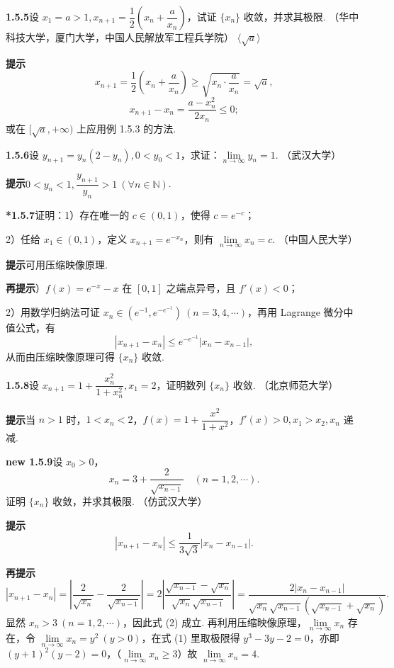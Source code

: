 \documentclass[UTF8, 12pt, fontset=fandol, oneside]{ctexart}
\begin{document}
\noindent\textbf{1.5.5}\quad 设 $x_1=a>1,x_{n+1}=\dfrac12\left(x_n+\dfrac a{x_n}\right)$，试证 $\{x_n\}$ 收敛，并求其极限. （华中科技大学，厦门大学，中国人民解放军工程兵学院） \hfill $\langle\sqrt a\rangle$

\noindent\textbf{提示}\quad
\[
  x_{n+1}=\frac12\left(x_n+\frac a{x_n}\right)\ge \sqrt{x_n\cdot \frac a{x_n}}=\sqrt a,
\]
\[
  x_{n+1}-x_n=\frac{a-x_n^2}{2x_n}\le 0;
\]
或在 $[\sqrt a,+\infty)$ 上应用例 1.5.3 的方法.

\noindent\textbf{1.5.6}\quad 设 $y_{n+1}=y_n(2-y_n),0<y_0<1$，求证：$\lim\limits_{n\to\infty}y_n=1$. （武汉大学）

\noindent\textbf{提示}\quad $0<y_n<1,\dfrac{y_{n+1}}{y_n}>1\ (\forall n\in\mathbb{N})$.

\noindent\textbf{*1.5.7}\quad 证明：1）存在唯一的 $c\in (0,1)$，使得 $c=e^{-c}$；

2）任给 $x_1\in (0,1)$，定义 $x_{n+1}=e^{-x_n}$，则有 $\lim\limits_{n\to\infty}x_n=c$. （中国人民大学）

\noindent\textbf{提示}\quad 可用压缩映像原理.

\noindent\textbf{再提示}）$f(x)=e^{-x}-x$ 在 $[0,1]$ 之端点异号，且 $f'(x)<0$；

2）用数学归纳法可证 $x_n\in (e^{-1},e^{-e^{-1}})\ (n=3,4,\cdots)$，再用 Lagrange 微分中值公式，有
\[
  |x_{n+1}-x_n|\le e^{-e^{-1}}|x_n-x_{n-1}|,
\]
从而由压缩映像原理可得 $\{x_n\}$ 收敛.

\noindent\textbf{1.5.8}\quad 设 $x_{n+1}=1+\dfrac{x_n^2}{1+x_n^2},x_1=2$，证明数列 $\{x_n\}$ 收敛. （北京师范大学）

\noindent\textbf{提示}\quad 当 $n>1$ 时，$1<x_n<2$，$f(x)=1+\dfrac{x^2}{1+x^2}$，$f'(x)>0,x_1>x_2,x_n$ 递减.

\noindent\textbf{new 1.5.9}\quad 设 $x_0>0$，
\[
  x_n=3+\frac{2}{\sqrt{x_{n-1}}}\quad (n=1,2,\cdots).
\tag{1}
\]
证明 $\{x_n\}$ 收敛，并求其极限. （仿武汉大学）

\noindent\textbf{提示}\quad
\[
  |x_{n+1}-x_n|\le \frac1{3\sqrt3}|x_n-x_{n-1}|.
\tag{2}
\]

\noindent\textbf{再提示}\quad
\[
  |x_{n+1}-x_n|
  =\left|\frac2{\sqrt{x_n}}-\frac2{\sqrt{x_{n-1}}}\right|
  =2\left|\frac{\sqrt{x_{n-1}}-\sqrt{x_n}}{\sqrt{x_n}\sqrt{x_{n-1}}}\right|
  =\frac{2|x_n-x_{n-1}|}{\sqrt{x_n}\sqrt{x_{n-1}}(\sqrt{x_{n-1}}+\sqrt{x_n})}.
\]
显然 $x_n>3\ (n=1,2,\cdots)$，因此式 (2) 成立. 再利用压缩映像原理，$\lim\limits_{n\to\infty}x_n$ 存在，令 $\lim\limits_{n\to\infty}x_n=y^2\ (y>0)$，在式 (1) 里取极限得 $y^3-3y-2=0$，亦即 $(y+1)^2(y-2)=0$，（$\lim\limits_{n\to\infty}x_n\ge 3$）故 $\lim\limits_{n\to\infty}x_n=4$.
\end{document}
